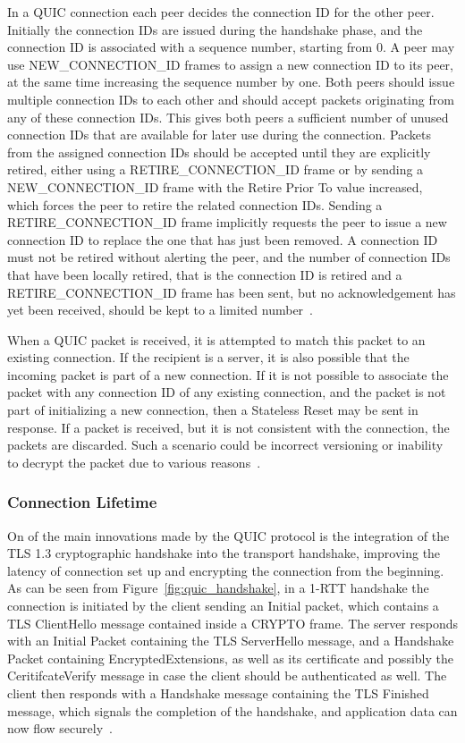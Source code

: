 \documentclass[english, 12pt, a4paper, elec, utf8, a-2b, online]{aaltothesis}
\begin{document}
In a QUIC connection each peer decides the connection ID for the other peer. Initially
the connection IDs are issued during the handshake phase, and the connection ID is
associated with a sequence number, starting from 0. A peer may use NEW\_CONNECTION\_ID frames
to assign a new connection ID to its peer, at the same time increasing the sequence
number by one. Both peers should issue multiple connection IDs to each other
and should accept packets originating from any of these connection IDs. This gives both peers
a sufficient number of unused connection IDs that are available for later use during
the connection. Packets from the assigned connection IDs should be accepted until
they are explicitly retired, either using a RETIRE\_CONNECTION\_ID frame or by
sending a NEW\_CONNECTION\_ID frame with the Retire Prior To value increased, which
forces the peer to retire the related connection IDs. Sending a RETIRE\_CONNECTION\_ID
frame implicitly requests the peer to issue a new connection ID to replace the one
that has just been removed. A connection ID must not be retired without alerting the peer,
and the number of connection IDs that have been locally retired, that is the connection
ID is retired and a RETIRE\_CONNECTION\_ID frame has been sent, but no acknowledgement
has yet been received, should be kept to a limited number~\cite{rfc9000}.

When a QUIC packet is received, it is attempted to match this packet to an existing
connection. If the recipient is a server, it is also possible that the incoming
packet is part of a new connection. If it is not possible to associate the packet
with any connection ID of any existing connection, and the packet is not part of
initializing a new connection, then a Stateless Reset may be sent in response. If
a packet is received, but it is not consistent with the connection, the packets
are discarded. Such a scenario could be incorrect versioning or inability to
decrypt the packet due to various reasons~\cite{rfc9000}.

\subsubsection{Connection Lifetime}

On of the main innovations made by the QUIC protocol is the integration of the
TLS 1.3 cryptographic handshake into the transport handshake, improving the latency
of connection set up and encrypting the connection from the beginning. As can be
seen from Figure~\ref{fig:quic_handshake}, in a 1-RTT handshake the connection is initiated by the client
sending an Initial packet, which contains a TLS ClientHello message
contained inside a CRYPTO frame. The server responds with an Initial Packet containing
the TLS ServerHello message, and a Handshake Packet containing EncryptedExtensions, as
well as its certificate and possibly the CeritifcateVerify message in case the client
should be authenticated as well. The client then responds with a Handshake message
containing the TLS Finished message, which signals the completion of the handshake,
and application data can now flow securely~\cite{rfc9000, rfc9001}.
\end{document}
